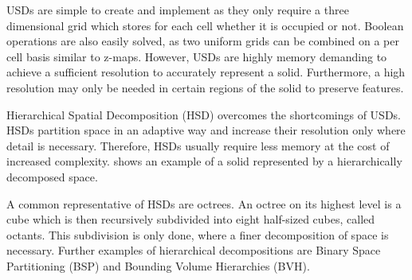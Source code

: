 \begin{description}
	USDs are simple to create and implement as they only require a three dimensional grid which stores for each cell whether it is occupied or not.
	Boolean operations are also easily solved, as two uniform grids can be combined on a per cell basis similar to z-maps.
	However, USDs are highly memory demanding to achieve a sufficient resolution to accurately represent a solid.
	Furthermore, a high resolution may only be needed in certain regions of the solid to preserve features.

	Hierarchical Spatial Decomposition (HSD) overcomes the shortcomings of USDs.
	HSDs partition space in an adaptive way and increase their resolution only where detail is necessary.
	Therefore, HSDs usually require less memory at the cost of increased complexity.
	 shows an example of a solid represented by a hierarchically decomposed space.

	A common representative of HSDs are octrees.
	An octree on its highest level is a cube which is then recursively subdivided into eight half-sized cubes, called octants.
	This subdivision is only done, where a finer decomposition of space is necessary.
	Further examples of hierarchical decompositions are Binary Space Partitioning (BSP) and Bounding Volume Hierarchies (BVH).


\end{description}
